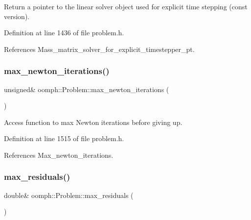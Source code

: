 Return a pointer to the linear solver object used for explicit time stepping (const version). 

Definition at line 1436 of file problem.\+h.



References Mass\+\_\+matrix\+\_\+solver\+\_\+for\+\_\+explicit\+\_\+timestepper\+\_\+pt.

\mbox{\label{classoomph_1_1Problem_aa30b2e89f61a327ffb1be4ff30bb868f}} 
\subsubsection{\texorpdfstring{max\+\_\+newton\+\_\+iterations()}{max\_newton\_iterations()}}
{\footnotesize\ttfamily unsigned\& oomph\+::\+Problem\+::max\+\_\+newton\+\_\+iterations (\begin{DoxyParamCaption}{ }\end{DoxyParamCaption})\hspace{0.3cm}{\ttfamily [inline]}}



Access function to max Newton iterations before giving up. 



Definition at line 1515 of file problem.\+h.



References Max\+\_\+newton\+\_\+iterations.

\mbox{\label{classoomph_1_1Problem_a2ad78241135f621df36bc1b9634845ac}} 
\subsubsection{\texorpdfstring{max\+\_\+residuals()}{max\_residuals()}}
{\footnotesize\ttfamily double\& oomph\+::\+Problem\+::max\+\_\+residuals (\begin{DoxyParamCaption}{ }\end{DoxyParamCaption})\hspace{0.3cm}{\ttfamily [inline]}}



